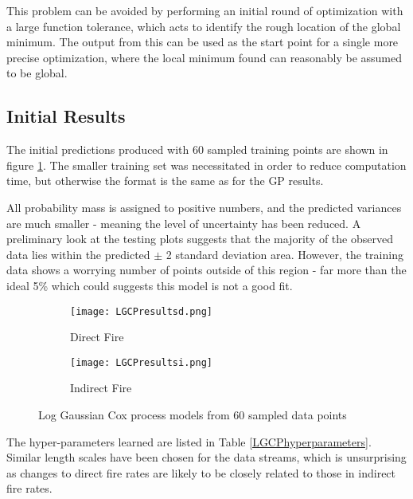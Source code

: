 \documentclass[a4paper,11pt]{report}
\begin{document}
This problem can be avoided by performing an initial round of optimization with a large function tolerance, which acts to identify the rough location of the global minimum. The output from this can be used as the start point for a single more precise optimization, where the local minimum found can reasonably be assumed to be global.


\subsection{Initial Results}

The initial predictions produced with 60 sampled training points are shown in figure \ref{fig:LGCPresults}. The smaller training set was necessitated in order to reduce computation time, but otherwise the format is the same as for the GP results. \par

All probability mass is assigned to positive numbers, and the predicted variances are much smaller - meaning the level of uncertainty has been reduced. A preliminary look at the testing plots suggests that the majority of the observed  data lies within the predicted \(\pm\) 2 standard deviation area. However, the training data shows a worrying number of points outside of this region - far more than the ideal 5\% which could suggests this model is not a good fit. 

\par
\begin{figure}
\centering
\begin{subfigure}{.5\textwidth}
	\centering
	\texttt{[image: LGCPresultsd.png]}
  	\caption{Direct Fire}
\end{subfigure}%
\begin{subfigure}{.5\textwidth}
  	\centering
  	\texttt{[image: LGCPresultsi.png]}
  	\caption{Indirect Fire}
\end{subfigure}
\caption{Log Gaussian Cox process models from 60 sampled data points}
\label{fig:LGCPresults}
\end{figure}

The hyper-parameters learned are listed in Table \ref{LGCPhyperparameters}. Similar length scales have been chosen for the data streams, which is unsurprising as changes to direct fire rates are likely to be closely related to those in indirect fire rates. 

\end{document}
